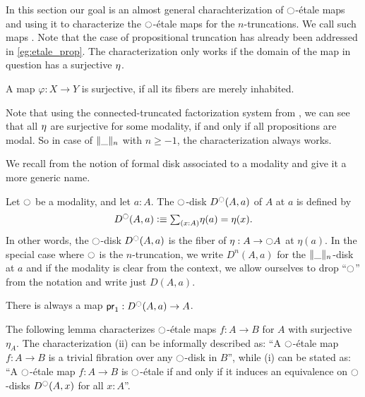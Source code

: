 \documentclass[9pt,twosided]{amsart}
\begin{document}
In this section our goal is an almost general charachterization of ${\ocircle}$-étale maps and using it to characterize the ${\ocircle}$-\'etale maps for the $n$-truncations. We call such maps . Note that the case of propositional truncation has already been addressed in \cref{eg:etale_prop}.
The characterization only works if the domain of the map in question has a surjective ${\eta_{}}$.
\begin{defn}
  A map $\varphi:X\to Y$ is surjective, if all its fibers are merely inhabited.
\end{defn}
Note that using the connected-truncated factorization system from \cite{RijkeSpittersShulman}, we can see that all ${\eta_{}}$ are surjective for some modality, if and only if all propositions are modal.
So in case of $\trunc{n}{\_}$ with $n\geq -1$, the characterization always works.

We recall from \cite{wellen-thesis} the notion of formal disk associated to a modality and give it a more generic name.

\begin{defn}
  Let ${\ocircle}$ be a modality, and let $a:A$. The ${\ocircle}$-disk $D^{{\ocircle}}(A,a)$ of $A$ at $a$ is defined by
  \begin{equation*}
    D^\modal(A,a)\defeq \sm{x:A}\eta(a)=\eta(x).
  \end{equation*}
  In other words, the ${\ocircle}$-disk $D^{\ocircle}(A,a)$ is the fiber of $\eta:A\to{\ensuremath{\ocircle}} A$ at $\eta(a)$. In the special case where ${\ocircle}$ is the $n$-truncation, we write $D^n(A,a)$ for the $\trunc{n}{\_}$-disk at $a$ and if the modality is clear from the context, we allow ourselves to drop ``${\ocircle}$'' from the notation and write just $D(A,a)$.
\end{defn}

There is always a map $\mathsf{pr}_{1}:D^{\ocircle}(A,a)\to A$.

The following lemma characterizes ${\ocircle}$-étale maps $f:A\to B$ for $A$ with surjective $\eta_A$.
The characterization (ii) can be informally described as: ``A ${\ocircle}$-étale map $f:A\to B$ is a trivial fibration over any ${\ocircle}$-disk  in $B$'',
while (i) can be stated as: ``A ${\ocircle}$-étale map $f:A\to B$ is ${\ocircle}$-étale if and only if it induces an equivalence on ${\ocircle}$-disks $D^{\ocircle}(A,x)$ for all $x:A$''. 
\end{document}
